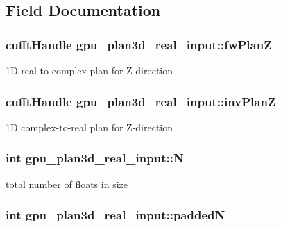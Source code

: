 \subsection{Field Documentation}
\hypertarget{structgpu__plan3d__real__input_ae39275ea173f7d06fe87cf75bd1ca0b2}{
\subsubsection[{fwPlanZ}]{\setlength{\rightskip}{0pt plus 5cm}cufftHandle {\bf gpu\_\-plan3d\_\-real\_\-input::fwPlanZ}}}
\label{structgpu__plan3d__real__input_ae39275ea173f7d06fe87cf75bd1ca0b2}


1D real-\/to-\/complex plan for Z-\/direction 

\hypertarget{structgpu__plan3d__real__input_a91b425c652f16c10a152dcff097a5b04}{
\subsubsection[{invPlanZ}]{\setlength{\rightskip}{0pt plus 5cm}cufftHandle {\bf gpu\_\-plan3d\_\-real\_\-input::invPlanZ}}}
\label{structgpu__plan3d__real__input_a91b425c652f16c10a152dcff097a5b04}


1D complex-\/to-\/real plan for Z-\/direction 

\hypertarget{structgpu__plan3d__real__input_a0d093b066f8063cc183c8340790bdf14}{
\subsubsection[{N}]{\setlength{\rightskip}{0pt plus 5cm}int {\bf gpu\_\-plan3d\_\-real\_\-input::N}}}
\label{structgpu__plan3d__real__input_a0d093b066f8063cc183c8340790bdf14}


total number of floats in size 

\hypertarget{structgpu__plan3d__real__input_a94d7eac29ab42754d7fdba51c563f419}{
\subsubsection[{paddedN}]{\setlength{\rightskip}{0pt plus 5cm}int {\bf gpu\_\-plan3d\_\-real\_\-input::paddedN}}}
\label{structgpu__plan3d__real__input_a94d7eac29ab42754d7fdba51c563f419}


